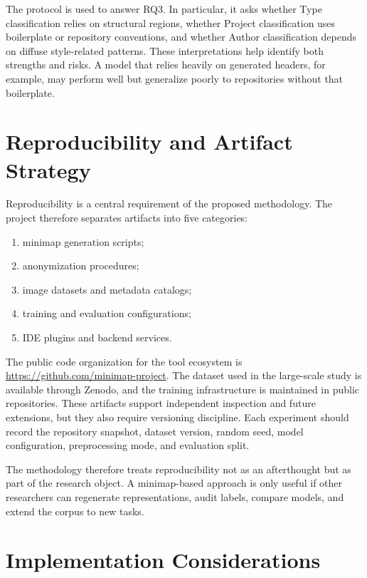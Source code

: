 The protocol is used to answer RQ3. In particular, it asks whether Type
classification relies on structural regions, whether Project classification uses
boilerplate or repository conventions, and whether Author classification depends
on diffuse style-related patterns. These interpretations help identify both
strengths and risks. A model that relies heavily on generated headers, for
example, may perform well but generalize poorly to repositories without that
boilerplate.

\section{Reproducibility and Artifact Strategy}

Reproducibility is a central requirement of the proposed methodology. The
project therefore separates artifacts into five categories:

\begin{enumerate}
    \item minimap generation scripts;
    \item anonymization procedures;
    \item image datasets and metadata catalogs;
    \item training and evaluation configurations;
    \item IDE plugins and backend services.
\end{enumerate}

The public code organization for the tool ecosystem is
\url{https://github.com/minimap-project}. The dataset used in the large-scale
study is available through Zenodo, and the training infrastructure is maintained
in public repositories. These artifacts support independent inspection and
future extensions, but they also require versioning discipline. Each experiment
should record the repository snapshot, dataset version, random seed, model
configuration, preprocessing mode, and evaluation split.

The methodology therefore treats reproducibility not as an afterthought but as
part of the research object. A minimap-based approach is only useful if other
researchers can regenerate representations, audit labels, compare models, and
extend the corpus to new tasks.

\section{Implementation Considerations}

